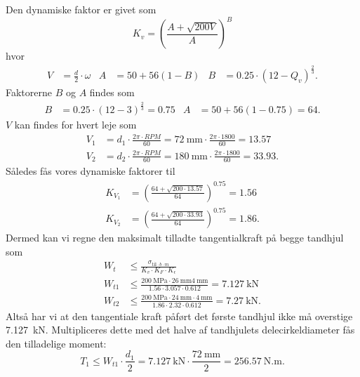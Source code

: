 \begin{derivation}
      Den dynamiske faktor er givet som
      \begin{equation*}
        K_v = \left( \frac{A + \sqrt{200V}}{A} \right)^{B}
      \end{equation*}
      hvor
      \begin{align*}
        V &= \frac{d}{2} \cdot \omega & A &= \num{50} + \num{56} (1-B) & B &= \num{0,25} \cdot \left( 12 - Q_v \right)^{\frac{2}{3}}
      .\end{align*}
      Faktorerne $B$ og $A$ findes som
      \begin{align*}
        B &= \num{0,25} \cdot \left( 12 - 3 \right)^{\frac{2}{3}} = \num{0,75} &         A &= 50 + 56(1-\num{0,75} ) = 64
      .\end{align*}
      $V$ kan findes for hvert leje som
      \begin{align*}
        V_1 &= d_1 \cdot \frac{2\pi \cdot RPM}{60} = \qty{72}{\mm} \cdot \frac{2 \pi \cdot 1800}{60} = \num{13,57} \\
        V_2 &= d_2 \cdot \frac{2\pi \cdot RPM}{60} = \qty{180}{\mm} \cdot \frac{2\pi \cdot 1800}{60} = \num{33,93}
      .\end{align*}
      Således fås vores dynamiske faktorer til
      \begin{align*}
        K_{V_1} &= \left( \frac{64 + \sqrt{200 \cdot \num{13,57}}}{64} \right)^{\num{0,75} } = \num{1,56} \\
        K_{V_2} &= \left( \frac{64 + \sqrt{200 \cdot \num{33,93}}}{64} \right)^{\num{0,75} } = \num{1,86} 
      .\end{align*}
      Dermed kan vi regne den maksimalt tilladte tangentialkraft på begge tandhjul som
      \begin{align*}
        W_{t} &\leq \frac{\sigma_{\mathrm{til} \cdot b \cdot m}}{K_v \cdot K_F \cdot K_{\epsilon}} \\
        W_{t1} &\leq \frac{\qty{200}{\MPa} \cdot \qty{26}{\mm} \qty{4}{\mm} }{\num{1,56} \cdot \num{3,057} \cdot \num{0,612}} = \qty{7,127}{\kN} \\
        W_{t2} &\leq \frac{\qty{200}{\MPa} \cdot \qty{24}{\mm} \cdot \qty{4}{\mm} }{\num{1,86} \cdot \num{2,32} \cdot \num{0,612} } = \qty{7,27}{\kN} 
      .\end{align*}
      Altså har vi at den tangentiale kraft påført det første tandhjul ikke må overstige \qty{7,127}{\kN}. Multipliceres dette med det halve af tandhjulets delecirkeldiameter fås den tilladelige moment:
      \begin{equation*}
        T_1 \leq W_{t1} \cdot \frac{d_1}{2} = \qty{7,127}{\kN} \cdot \frac{\qty{72}{\mm} }{2} = \qty{256,57}{\N.\m} 
      .\end{equation*}
    \end{derivation}

